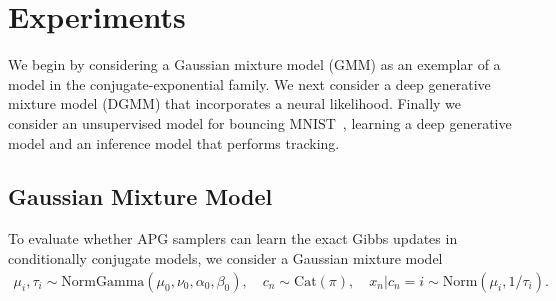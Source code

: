 \documentclass[anonymous=false, %
               format=acmsmall, %
               review=true, %
               screen=true, %
               nonacm=true]{acmart}
\theoremstyle{definition}
\begin{document}
\section{Experiments}
\label{sec:experiments}

We begin by considering a Gaussian mixture model (GMM) as an exemplar of a model in the conjugate-exponential family. 
We next consider a deep generative mixture model (DGMM) that incorporates a neural likelihood. 
Finally we consider an unsupervised model for bouncing MNIST~\cite{srivastava2015unsupervised}, learning a deep generative model and an inference model that performs tracking.


\subsection{Gaussian Mixture Model}
\label{sec:gmm}
\vspace{-0.5em}
To evaluate whether APG samplers can learn the exact Gibbs updates in conditionally conjugate models, we consider a Gaussian mixture model 
\begin{align*}
    \mu_i, \tau_i \sim \text{NormGamma}(\mu_0, \nu_0, \alpha_0, \beta_0)
    ,
    \quad
    c_n \sim \mathrm{Cat}(\pi)
    ,
    \quad
    x_n | c_n\!=\!i \sim \text{Norm}(\mu_i, 1 / \tau_i)
    .
\end{align*}
\end{document}
